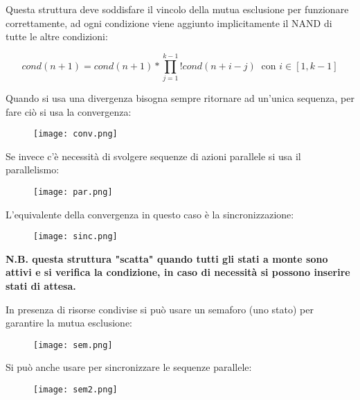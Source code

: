 \documentclass{article}
\begin{document}
\noindent Questa struttura deve soddisfare il vincolo della mutua esclusione per funzionare correttamente, ad ogni condizione viene aggiunto implicitamente il NAND di tutte le altre condizioni:

$$cond(n+1)=cond(n+1)*\prod_{j=1}^{k-1}!cond(n+i-j)\ \text{ con } i\in[1,k-1]$$

\newpage

\noindent Quando si usa una divergenza bisogna sempre ritornare ad un'unica sequenza, per fare ciò si usa la convergenza:
\begin{figure}[ht]
    \centering
    \texttt{[image: conv.png]}
\end{figure}

\vspace{10pt}

\noindent Se invece c'è necessità di svolgere sequenze di azioni parallele si usa il parallelismo:
\begin{figure}[ht]
    \centering
    \texttt{[image: par.png]}
\end{figure}

\vspace{10pt}

\noindent L'equivalente della convergenza in questo caso è la sincronizzazione:
\begin{figure}[ht]
    \centering
    \texttt{[image: sinc.png]}
\end{figure}

\noindent\textbf{N.B. questa struttura "scatta" quando tutti gli stati a monte sono attivi e si verifica la condizione, in caso di necessità si possono inserire stati di attesa.}

\newpage

\noindent In presenza di risorse condivise si può usare un semaforo (uno stato) per garantire la mutua esclusione:

\begin{figure}[ht]
    \centering
    \texttt{[image: sem.png]}
\end{figure}

\vspace{10pt}

\noindent Si può anche usare per sincronizzare le sequenze parallele:

\begin{figure}[ht]
    \centering
    \texttt{[image: sem2.png]}
\end{figure}
\end{document}
